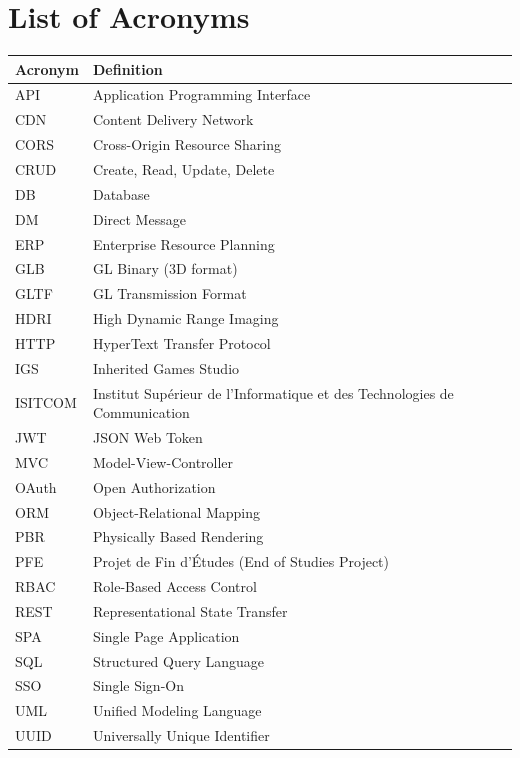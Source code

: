 \documentclass[12pt, a4paper, oneside]{report}
\begin{document}
\chapter*{List of Acronyms}
\begin{tabular}{L{3cm} L{12cm}}
\toprule
\textbf{Acronym} & \textbf{Definition} \\
\midrule
API    & Application Programming Interface \\
CDN    & Content Delivery Network \\
CORS   & Cross-Origin Resource Sharing \\
CRUD   & Create, Read, Update, Delete \\
DB     & Database \\
DM     & Direct Message \\
ERP    & Enterprise Resource Planning \\
GLB    & GL Binary (3D format) \\
GLTF   & GL Transmission Format \\
HDRI   & High Dynamic Range Imaging \\
HTTP   & HyperText Transfer Protocol \\
IGS    & Inherited Games Studio \\
ISITCOM & Institut Supérieur de l'Informatique et des Technologies de Communication \\
JWT    & JSON Web Token \\
MVC    & Model-View-Controller \\
OAuth  & Open Authorization \\
ORM    & Object-Relational Mapping \\
PBR    & Physically Based Rendering \\
PFE    & Projet de Fin d'Études (End of Studies Project) \\
RBAC   & Role-Based Access Control \\
REST   & Representational State Transfer \\
SPA    & Single Page Application \\
SQL    & Structured Query Language \\
SSO    & Single Sign-On \\
UML    & Unified Modeling Language \\
UUID   & Universally Unique Identifier \\
\bottomrule
\end{tabular}

\clearpage
{}
\setcounter{page}{1}
\end{document}
